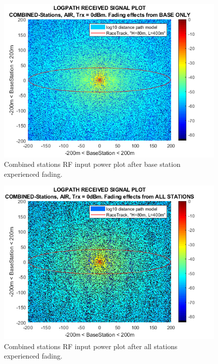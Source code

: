 \begin{figure}[H]
	\centering
	\includegraphics[width=\linewidth]{theory/fading/fig/logpathReceivedSignal_combinedStations_baseOnly.png}
	\caption{Combined stations RF input power plot after base station experienced fading.}
	\label{fig:logpathReceivedSignal_combinedStations_baseOnly}
\end{figure}

\begin{figure}[H]
\centering
\includegraphics[width=\linewidth]{theory/fading/fig/logpathReceivedSignal_combinedStations_allStations.png}
\caption{Combined stations RF input power plot after all stations experienced fading.}
\label{fig:logpathReceivedSignal_combinedStations_allStations}
\end{figure}

